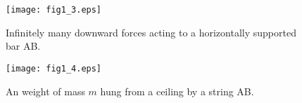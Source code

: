 \begin{figure}[h]
	\begin{center}
	\texttt{[image: fig1\_3.eps]} 
	\end{center}
	\caption{Infinitely many downward forces acting to a horizontally supported bar AB.}
	\label{fig:fig1_3}
\end{figure}
\begin{figure}[h]
	\begin{center}
	\texttt{[image: fig1\_4.eps]} 
	\end{center}
	\caption{An weight of mass $m$ hung from a ceiling by a string AB.} 
	\label{fig:fig1_4}
\end{figure}
